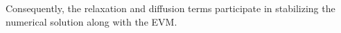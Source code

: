 \documentclass[times,doublespace]{fldauth}%
\begin{document}
Consequently, the relaxation and diffusion terms participate in stabilizing the numerical solution along with the EVM.
%
\end{document}
